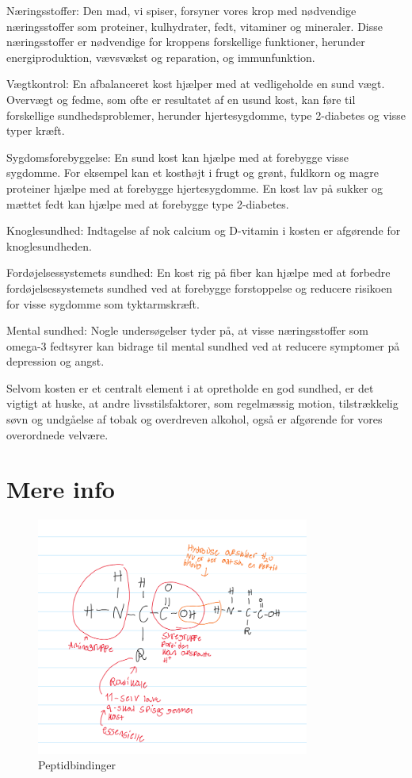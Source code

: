     Næringsstoffer: Den mad, vi spiser, forsyner vores krop med nødvendige næringsstoffer som proteiner, kulhydrater, fedt, vitaminer og mineraler. Disse næringsstoffer er nødvendige for kroppens forskellige funktioner, herunder energiproduktion, vævsvækst og reparation, og immunfunktion.

    Vægtkontrol: En afbalanceret kost hjælper med at vedligeholde en sund vægt. Overvægt og fedme, som ofte er resultatet af en usund kost, kan føre til forskellige sundhedsproblemer, herunder hjertesygdomme, type 2-diabetes og visse typer kræft.

    Sygdomsforebyggelse: En sund kost kan hjælpe med at forebygge visse sygdomme. For eksempel kan et kosthøjt i frugt og grønt, fuldkorn og magre proteiner hjælpe med at forebygge hjertesygdomme. En kost lav på sukker og mættet fedt kan hjælpe med at forebygge type 2-diabetes.

    Knoglesundhed: Indtagelse af nok calcium og D-vitamin i kosten er afgørende for knoglesundheden.

    Fordøjelsessystemets sundhed: En kost rig på fiber kan hjælpe med at forbedre fordøjelsessystemets sundhed ved at forebygge forstoppelse og reducere risikoen for visse sygdomme som tyktarmskræft.

    Mental sundhed: Nogle undersøgelser tyder på, at visse næringsstoffer som omega-3 fedtsyrer kan bidrage til mental sundhed ved at reducere symptomer på depression og angst.

    Selvom kosten er et centralt element i at opretholde en god sundhed, er det vigtigt at huske, at andre livsstilsfaktorer, som regelmæssig motion, tilstrækkelig søvn og undgåelse af tobak og overdreven alkohol, også er afgørende for vores overordnede velvære.
\section{Mere info}
\begin{figure}[h]
    \centering
    \includegraphics[width=0.8\textwidth]{figurs/peptidbindinger.png}
    \caption{Peptidbindinger}
    \label{fig:peptidbindinger}
\end{figure}